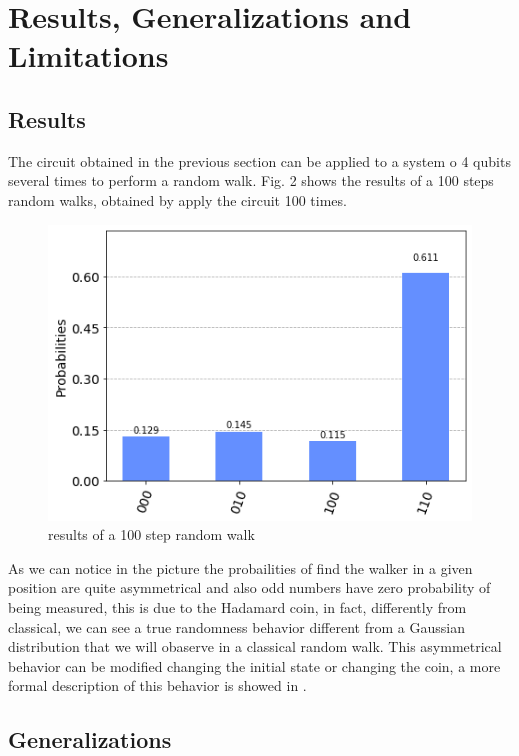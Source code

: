 \section{Results, Generalizations and Limitations}

\subsection{Results}

The circuit obtained in the previous section can be applied to a system o 4 qubits several times to perform a random walk. 
Fig. 2 shows the results of a 100 steps random walks, obtained by apply the circuit 100 times. 

\begin{figure}[h!]
    \includegraphics[scale=0.4]{img/100_steps_walk.png}
    \caption{results of a 100 step random walk}
    \centering
\end{figure}

As we can notice in the picture the probailities of find the walker in a given position are 
quite asymmetrical and also odd numbers have zero probability of being measured, this is due to 
the Hadamard coin, in fact, differently from classical, we can 
see a true randomness behavior different from a Gaussian distribution that we will obaserve in a 
classical random walk. This asymmetrical behavior can be modified changing the initial state or 
changing the coin, a more formal description of this behavior is showed in \cite{6812670}.

\subsection{Generalizations}

